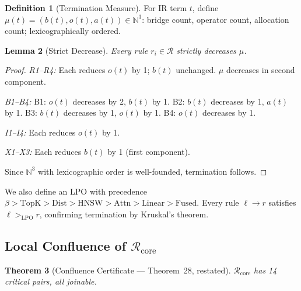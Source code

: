 \documentclass{article}
\newtheorem{theorem}{Theorem}
\newtheorem{lemma}[theorem]{Lemma}
\theoremstyle{definition}
\newtheorem{definition}[theorem]{Definition}
\theoremstyle{remark}
\begin{document}
\begin{definition}[Termination Measure]
For IR term $t$, define $\mu(t) = (b(t), o(t), a(t)) \in \mathbb{N}^3$: bridge count, operator count, allocation count; lexicographically ordered.
\end{definition}

\begin{lemma}[Strict Decrease]\label{lem:strict-decrease}
Every rule $r_i \in \mathcal{R}$ strictly decreases $\mu$.
\end{lemma}

\begin{proof}
\emph{R1--R4:} Each reduces $o(t)$ by 1; $b(t)$ unchanged. $\mu$ decreases in second component.

\emph{B1--B4:} B1: $o(t)$ decreases by 2, $b(t)$ by 1. B2: $b(t)$ decreases by 1, $a(t)$ by 1. B3: $b(t)$ decreases by 1, $o(t)$ by 1. B4: $o(t)$ decreases by 1.

\emph{I1--I4:} Each reduces $o(t)$ by 1.

\emph{X1--X3:} Each reduces $b(t)$ by 1 (first component).

Since $\mathbb{N}^3$ with lexicographic order is well-founded, termination follows.
\end{proof}

We also define an LPO with precedence $\beta > \mathrm{TopK} > \mathrm{Dist} > \mathrm{HNSW} > \mathrm{Attn} > \mathrm{Linear} > \mathrm{Fused}$. Every rule $\ell \to r$ satisfies $\ell >_{\mathrm{LPO}} r$, confirming termination by Kruskal's theorem.

\subsection{Local Confluence of $\mathcal{R}_{\mathrm{core}}$}

\begin{theorem}[Confluence Certificate --- Theorem~28, restated]\label{thm:cert-full}
$\mathcal{R}_{\mathrm{core}}$ has 14 critical pairs, all joinable.
\end{theorem}
\end{document}
